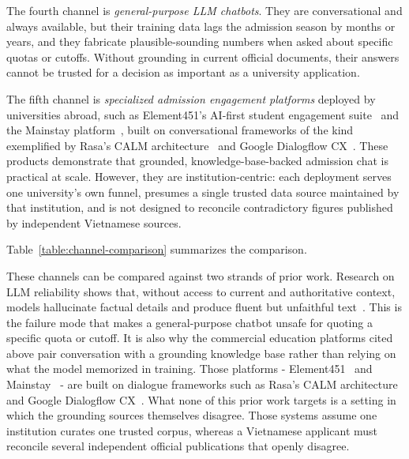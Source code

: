 \documentclass[../main.tex]{subfiles}
\begin{document}
The fourth channel is \textit{general-purpose \gls{LLM} chatbots}.
They are conversational and always available, but their training data lags the admission season by months or years, and they fabricate plausible-sounding numbers when asked about specific quotas or cutoffs.
Without grounding in current official documents, their answers cannot be trusted for a decision as important as a university application.

The fifth channel is \textit{specialized admission engagement platforms} deployed by universities abroad, such as Element451's AI-first student engagement suite~\cite{element451} and the Mainstay platform~\cite{mainstay}, built on conversational frameworks of the kind exemplified by Rasa's \gls{CALM} architecture~\cite{rasa_calm} and Google Dialogflow CX~\cite{dialogflow}.
These products demonstrate that grounded, knowledge-base-backed admission chat is practical at scale.
However, they are institution-centric: each deployment serves one university's own funnel, presumes a single trusted data source maintained by that institution, and is not designed to reconcile contradictory figures published by independent Vietnamese sources.

Table~\ref{table:channel-comparison} summarizes the comparison.

These channels can be compared against two strands of prior work.
Research on \gls{LLM} reliability shows that, without access to current and authoritative context, models hallucinate factual details and produce fluent but unfaithful text~\cite{ji2023hallucination}.
This is the failure mode that makes a general-purpose chatbot unsafe for quoting a specific quota or cutoff.
It is also why the commercial education platforms cited above pair conversation with a grounding knowledge base rather than relying on what the model memorized in training.
Those platforms - Element451~\cite{element451} and Mainstay~\cite{mainstay} - are built on dialogue frameworks such as Rasa's \gls{CALM} architecture~\cite{rasa_calm} and Google Dialogflow CX~\cite{dialogflow}.
What none of this prior work targets is a setting in which the grounding sources themselves disagree.
Those systems assume one institution curates one trusted corpus, whereas a Vietnamese applicant must reconcile several independent official publications that openly disagree.
\end{document}
